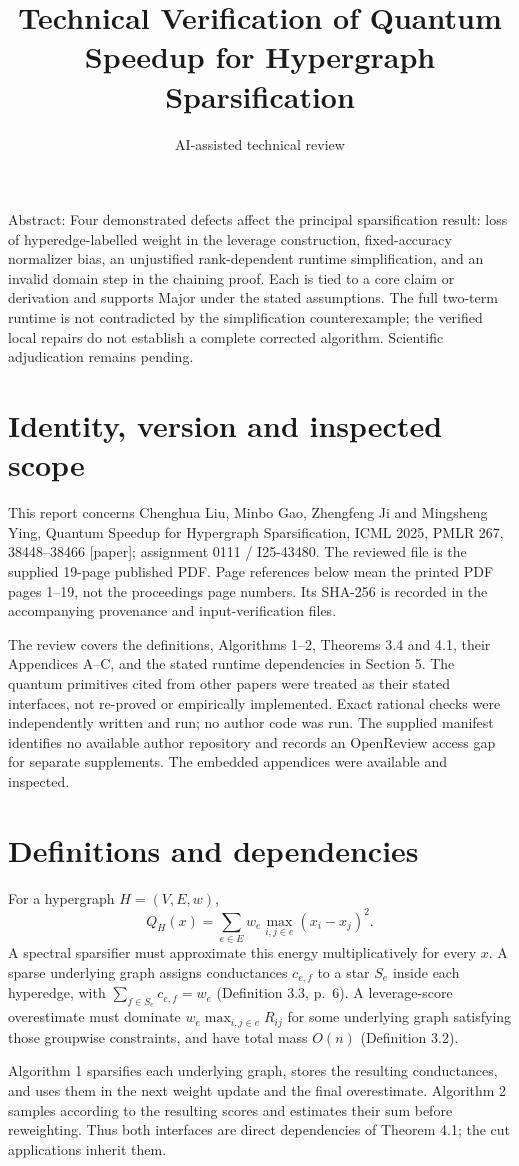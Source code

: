 \documentclass[10pt]{article}
\title{Technical Verification of
Quantum Speedup for Hypergraph Sparsification}
\author{AI-assisted technical review}
\date{}
\begin{document}
\maketitle
Abstract: Four demonstrated defects affect the principal sparsification result: loss of hyperedge-labelled weight in the leverage construction, fixed-accuracy normalizer bias, an unjustified rank-dependent runtime simplification, and an invalid domain step in the chaining proof. Each is tied to a core claim or derivation and supports Major under the stated assumptions. The full two-term runtime is not contradicted by the simplification counterexample; the verified local repairs do not establish a complete corrected algorithm. Scientific adjudication remains pending.\par
\section*{Identity, version and inspected scope}
This report concerns Chenghua Liu, Minbo Gao, Zhengfeng Ji and Mingsheng Ying, Quantum Speedup for Hypergraph Sparsification, ICML 2025, PMLR 267, 38448–38466 [paper]; assignment 0111 / I25-43480. The reviewed file is the supplied 19-page published PDF. Page references below mean the printed PDF pages 1–19, not the proceedings page numbers. Its SHA-256 is recorded in the accompanying provenance and input-verification files.\par
The review covers the definitions, Algorithms 1–2, Theorems 3.4 and 4.1, their Appendices A–C, and the stated runtime dependencies in Section 5. The quantum primitives cited from other papers were treated as their stated interfaces, not re-proved or empirically implemented. Exact rational checks were independently written and run; no author code was run. The supplied manifest identifies no available author repository and records an OpenReview access gap for separate supplements. The embedded appendices were available and inspected.\par
\section*{Definitions and dependencies}
For a hypergraph \(H=(V,E,w)\), \[Q_H(x)=\sum_{e\in E}w_e\max_{i,j\in e}(x_i-x_j)^2.\] A spectral sparsifier must approximate this energy multiplicatively for every \(x\). A sparse underlying graph assigns conductances \(c_{e,f}\) to a star \(S_e\) inside each hyperedge, with \(\sum_{f\in S_e}c_{e,f}=w_e\) (Definition 3.3, p. 6). A leverage-score overestimate must dominate \(w_e\max_{i,j\in e}R_{ij}\) for some underlying graph satisfying those groupwise constraints, and have total mass \(O(n)\) (Definition 3.2).\par
Algorithm 1 sparsifies each underlying graph, stores the resulting conductances, and uses them in the next weight update and the final overestimate. Algorithm 2 samples according to the resulting scores and estimates their sum before reweighting. Thus both interfaces are direct dependencies of Theorem 4.1; the cut applications inherit them.\par
\end{document}
